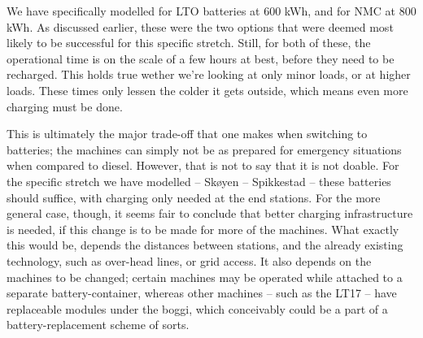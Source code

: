 \documentclass{article}
\begin{document}
We have specifically modelled for LTO batteries at 600 kWh, and for NMC at 800 kWh. As discussed earlier, these were the two options that were deemed most likely to be successful for this specific stretch. Still, for both of these, the operational time is on the scale of a few hours at best, before they need to be recharged. This holds true wether we’re looking at only minor loads, or at higher loads. These times only lessen the colder it gets outside, which means even more charging must be done. 

This is ultimately the major trade-off that one makes when switching to batteries; the machines can simply not be as prepared for emergency situations when compared to diesel. However, that is not to say that it is not doable. For the specific stretch we have modelled -- Skøyen – Spikkestad -- these batteries should suffice, with charging only needed at the end stations. For the more general case, though, it seems fair to conclude that better charging infrastructure is needed, if this change is to be made for more of the machines. What exactly this would be, depends the distances between stations, and the already existing technology, such as over-head lines, or grid access. It also depends on the machines to be changed; certain machines may be operated while attached to a separate battery-container, whereas other machines -- such as the LT17 -- have replaceable modules under the boggi, which conceivably could be a part of a battery-replacement scheme of sorts.

\pagebreak

\printbibliography %
\end{document}
